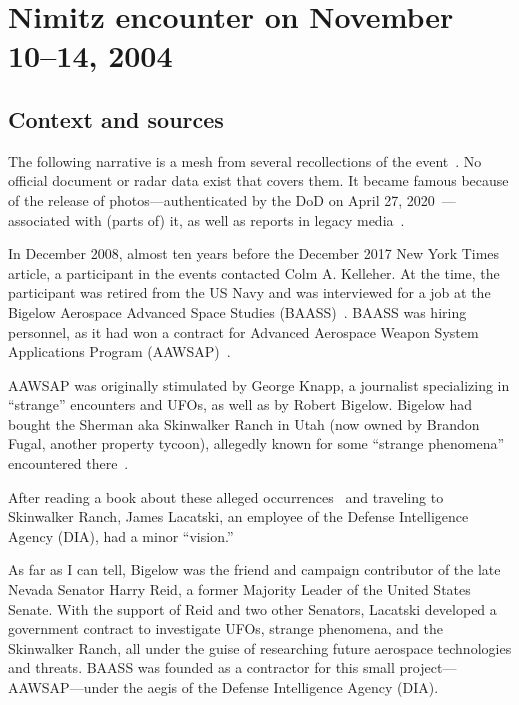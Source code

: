 \section{Nimitz encounter on November 10--14, 2004}
\label{2023-UFO-part-History-chapter-2004-2023-Nimitz}

\subsection{Context and sources}

The following narrative is a mesh from several recollections of the event~\cite{NimitzSCURep2019Mar,Chierici2015Mar,Mizokami2017Dec,Powerfuljre2019Oct}. No official document or radar data exist that covers them. It became famous because of the release of photos---authenticated by the DoD on April 27, 2020~\cite{DOD2020}---associated with (parts of) it, as well as reports in legacy media~\cite{CooperNYT2017,BryanBender2017}.

In December 2008, almost ten years before the December 2017 New York Times article,
a participant in the events contacted Colm A. Kelleher.
At the time, the participant was retired from the US Navy and was interviewed for a job at the
Bigelow Aerospace Advanced Space Studies (BAASS)~\cite[p.~41]{Lacatski-2021}.
BAASS was hiring personnel, as it had won a contract for
Advanced Aerospace Weapon System Applications Program (AAWSAP)~\cite{AAWSAP2008}.

AAWSAP was originally stimulated by George Knapp, a journalist specializing in ``strange'' encounters and UFOs,
as well as by Robert Bigelow. Bigelow had bought the
Sherman aka Skinwalker Ranch in Utah (now owned by Brandon Fugal, another property tycoon),
allegedly known for some ``strange phenomena'' encountered there~\cite{ShaefferSkeptic2022May}.

After reading a book about these alleged occurrences~\cite{ColmA.Kelleher2009Jul} and traveling to
Skinwalker Ranch, James Lacatski, an employee of the Defense Intelligence Agency (DIA),
 had a minor ``vision.''

As far as I can tell, Bigelow was the friend and campaign contributor of the late
Nevada Senator Harry Reid, a former Majority Leader of the United States Senate.
With the support of Reid and two other Senators,
Lacatski developed a government contract to investigate UFOs,
strange phenomena, and the Skinwalker Ranch, all under the guise of researching future aerospace technologies and threats.
BAASS was founded as a contractor for this small project---AAWSAP---under the aegis of the Defense Intelligence Agency (DIA).

